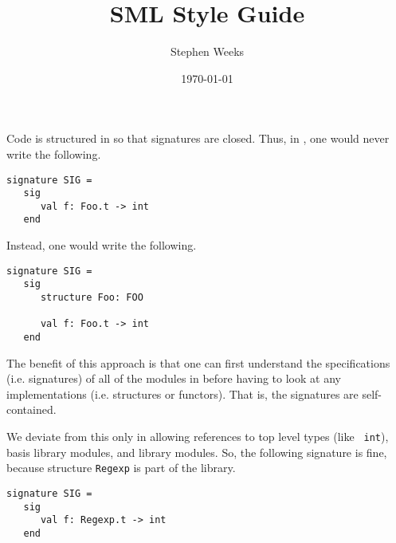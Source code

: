 \documentclass[12pt]{article}
\title{{\mlton} SML Style Guide}
\author{Stephen Weeks}
\date{\today}
\begin{document}
\maketitle




Code is structured in {\mlton} so that signatures are closed.  Thus, in
{\mlton}, one would never write the following.
\begin{verbatim}
signature SIG =
   sig
      val f: Foo.t -> int
   end
\end{verbatim}
Instead, one would write the following.
\begin{verbatim}
signature SIG =
   sig
      structure Foo: FOO

      val f: Foo.t -> int
   end
\end{verbatim}
The benefit of this approach is that one can first understand the
specifications (i.e. signatures) of all of the modules in {\mlton} before having
to look at any implementations (i.e. structures or functors).  That is, the
signatures are self-contained.

We deviate from this only in allowing references to top level types (like {\tt
int}), basis library modules, and {\mlton} library modules.  So, the following
signature is fine, because structure {\tt Regexp} is part of the {\mlton}
library.
\begin{verbatim}
signature SIG =
   sig
      val f: Regexp.t -> int
   end
\end{verbatim}
\end{document}
